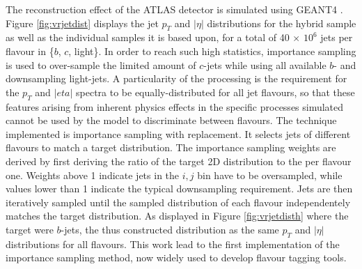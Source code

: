 The reconstruction effect of the ATLAS detector is simulated using GEANT4 \cite{Agostinelli:602040}. Figure \ref{fig:vrjetdist} displays the jet $p_T$ and $|\eta|$ distributions for the hybrid sample as well as the individual samples it is based upon, for a total of 40 $\times$ $10^6$ jets per flavour in \{$b$, $c$, light\}. In order to reach such high statistics, importance sampling is used to over-sample the limited amount of $c$-jets while using all available $b$- and downsampling light-jets. A particularity of the processing is the requirement for the $p_T$ and $|eta|$ spectra to be equally-distributed for all jet flavours, so that these features arising from inherent physics effects in the specific processes simulated cannot be used by the model to discriminate between flavours. The technique implemented is importance sampling with replacement. It selects jets of different flavours to match a target distribution. The importance sampling weights are derived by first deriving the ratio of the target 2D distribution to the per flavour one. Weights above 1 indicate jets in the $i, j$ bin have to be oversampled, while values lower than 1 indicate the typical downsampling requirement. Jets are then iteratively sampled until the sampled distribution of each flavour independentely matches the target distribution. As displayed in Figure \ref{fig:vrjetdisth} where the target were $b$-jets, the thus constructed distribution as the same $p_T$ and $|\eta|$ distributions for all flavours. This work lead to the first implementation of the importance sampling method, now widely used to develop flavour tagging tools.  

